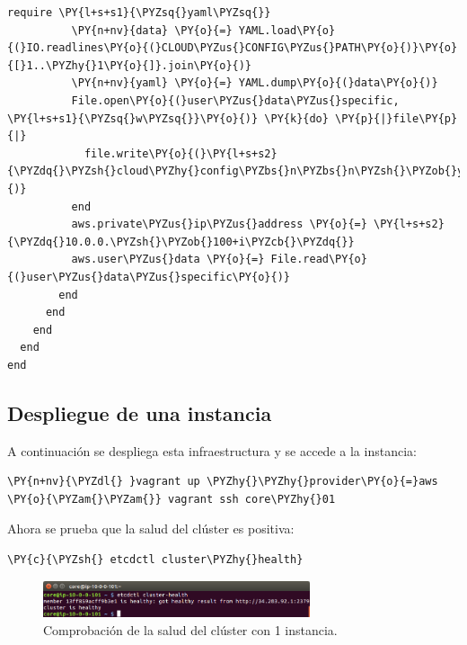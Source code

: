 \begin{codelisting}
\begin{Verbatim}[fontsize=\relsize{-2.5},fontseries=b,commandchars=\\\{\}]
          require \PY{l+s+s1}{\PYZsq{}yaml\PYZsq{}}
          \PY{n+nv}{data} \PY{o}{=} YAML.load\PY{o}{(}IO.readlines\PY{o}{(}CLOUD\PYZus{}CONFIG\PYZus{}PATH\PY{o}{)}\PY{o}{[}1..\PYZhy{}1\PY{o}{]}.join\PY{o}{)}
          \PY{n+nv}{yaml} \PY{o}{=} YAML.dump\PY{o}{(}data\PY{o}{)}
          File.open\PY{o}{(}user\PYZus{}data\PYZus{}specific, \PY{l+s+s1}{\PYZsq{}w\PYZsq{}}\PY{o}{)} \PY{k}{do} \PY{p}{|}file\PY{p}{|}
            file.write\PY{o}{(}\PY{l+s+s2}{\PYZdq{}\PYZsh{}cloud\PYZhy{}config\PYZbs{}n\PYZbs{}n\PYZsh{}\PYZob{}yaml\PYZcb{}\PYZdq{}}\PY{o}{)}
          end
          aws.private\PYZus{}ip\PYZus{}address \PY{o}{=} \PY{l+s+s2}{\PYZdq{}10.0.0.\PYZsh{}\PYZob{}100+i\PYZcb{}\PYZdq{}}
          aws.user\PYZus{}data \PY{o}{=} File.read\PY{o}{(}user\PYZus{}data\PYZus{}specific\PY{o}{)}
        end
      end
    end
  end
end
\end{Verbatim}
\end{codelisting}

\subsection{Despliegue de una instancia}

A continuación se despliega esta infraestructura y se accede a la instancia:

\begin{framed_shaded}
\begin{Verbatim}[fontsize=\relsize{-2.5},fontseries=b,commandchars=\\\{\}]
\PY{n+nv}{\PYZdl{} }vagrant up \PYZhy{}\PYZhy{}provider\PY{o}{=}aws \PY{o}{\PYZam{}\PYZam{}} vagrant ssh core\PYZhy{}01
\end{Verbatim}
\end{framed_shaded}

Ahora se prueba que la salud del clúster es positiva:

\begin{framed_shaded}
\begin{Verbatim}[fontsize=\relsize{-2.5},fontseries=b,commandchars=\\\{\}]
\PY{c}{\PYZsh{} etcdctl cluster\PYZhy{}health}
\end{Verbatim}
\end{framed_shaded}

\begin{figure}[H]
\centering
\includegraphics[width=0.7\textwidth]{images/figures/cluster-health-aws-1.png}
\caption{Comprobación de la salud del clúster con 1 instancia.}
\end{figure}

